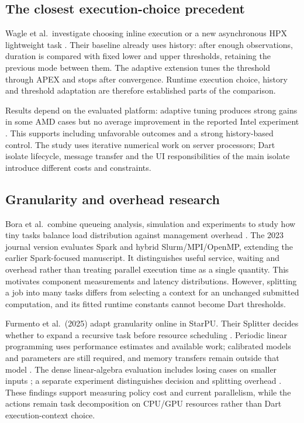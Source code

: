 \documentclass[14pt,a4paper,oneside]{extreport}
\begin{document}
\subsection{The closest execution-choice precedent}
\label{the-closest-execution-choice-precedent}

Wagle et al.~investigate choosing inline execution or a new asynchronous HPX lightweight task
\citep[pp.~4--6]{wagle2019}. Their baseline already uses history: after enough observations,
duration is compared with fixed lower and upper thresholds, retaining the previous mode
between them. The adaptive extension tunes the threshold through APEX and stops after
convergence. Runtime execution choice, history and threshold adaptation are therefore
established parts of the comparison.

Results depend on the evaluated platform: adaptive tuning produces strong gains in some AMD
cases but no average improvement in the reported Intel experiment \citep[p.~8]{wagle2019}.
This supports including unfavorable outcomes and a strong history-based control. The study
uses iterative numerical work on server processors; Dart isolate lifecycle, message transfer
and the UI responsibilities of the main isolate introduce different costs and constraints.

\subsection{Granularity and overhead research}
\label{granularity-and-overhead-research}

Bora et al.~combine queueing analysis, simulation and experiments to study how tiny tasks
balance load distribution against management overhead \citep{bora2023}. The 2023 journal
version evaluates Spark and hybrid Slurm/MPI/OpenMP, extending the earlier Spark-focused
manuscript. It distinguishes useful service, waiting and overhead rather than treating
parallel execution time as a single quantity. This motivates component measurements and
latency distributions. However, splitting a job into many tasks differs from selecting a
context for an unchanged submitted computation, and its fitted runtime constants cannot become
Dart thresholds.

Furmento et al.~(2025) adapt granularity online in StarPU. Their Splitter decides whether to
expand a recursive task before resource scheduling \citep[Sec. 3]{furmento2025}. Periodic
linear programming uses performance estimates and available work; calibrated models and
parameters are still required, and memory transfers remain outside that model
\citep[Secs. 4.2--4.4]{furmento2025}. The dense linear-algebra evaluation includes losing
cases on smaller inputs \citep[Sec. 5.3]{furmento2025}; a separate experiment distinguishes
decision and splitting overhead \citep[Sec. 5.5]{furmento2025}. These findings support
measuring policy cost and current parallelism, while the actions remain task decomposition on
CPU/GPU resources rather than Dart execution-context choice.
\end{document}
